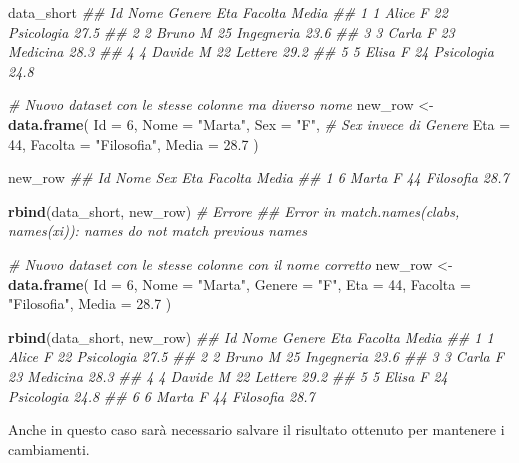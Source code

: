\documentclass[
]{book}
\newenvironment{Shaded}{\begin{snugshade}}{\end{snugshade}}
\newcommand{\CommentTok}[1]{\textcolor[rgb]{0.56,0.35,0.01}{\textit{#1}}}
\newcommand{\DataTypeTok}[1]{\textcolor[rgb]{0.13,0.29,0.53}{#1}}
\newcommand{\DecValTok}[1]{\textcolor[rgb]{0.00,0.00,0.81}{#1}}
\newcommand{\FloatTok}[1]{\textcolor[rgb]{0.00,0.00,0.81}{#1}}
\newcommand{\KeywordTok}[1]{\textcolor[rgb]{0.13,0.29,0.53}{\textbf{#1}}}
\newcommand{\NormalTok}[1]{#1}
\newcommand{\StringTok}[1]{\textcolor[rgb]{0.31,0.60,0.02}{#1}}
\begin{document}
\begin{Shaded}
\begin{Highlighting}[]
\NormalTok{data_short}
\CommentTok{##   Id   Nome Genere Eta    Facolta Media}
\CommentTok{## 1  1  Alice      F  22 Psicologia  27.5}
\CommentTok{## 2  2  Bruno      M  25 Ingegneria  23.6}
\CommentTok{## 3  3  Carla      F  23   Medicina  28.3}
\CommentTok{## 4  4 Davide      M  22    Lettere  29.2}
\CommentTok{## 5  5  Elisa      F  24 Psicologia  24.8}

\CommentTok{# Nuovo dataset con le stesse colonne ma diverso nome}
\NormalTok{new_row <-}\StringTok{ }\KeywordTok{data.frame}\NormalTok{(}
  \DataTypeTok{Id =} \DecValTok{6}\NormalTok{,}
  \DataTypeTok{Nome =} \StringTok{"Marta"}\NormalTok{,}
  \DataTypeTok{Sex =} \StringTok{"F"}\NormalTok{,      }\CommentTok{# Sex invece di Genere}
  \DataTypeTok{Eta =} \DecValTok{44}\NormalTok{,}
  \DataTypeTok{Facolta =} \StringTok{"Filosofia"}\NormalTok{,}
  \DataTypeTok{Media =} \FloatTok{28.7}
\NormalTok{)}

\NormalTok{new_row}
\CommentTok{##   Id  Nome Sex Eta   Facolta Media}
\CommentTok{## 1  6 Marta   F  44 Filosofia  28.7}

\KeywordTok{rbind}\NormalTok{(data_short, new_row) }\CommentTok{# Errore}
\CommentTok{## Error in match.names(clabs, names(xi)): names do not match previous names}

\CommentTok{# Nuovo dataset con le stesse colonne con il nome corretto}
\NormalTok{new_row <-}\StringTok{ }\KeywordTok{data.frame}\NormalTok{(}
  \DataTypeTok{Id =} \DecValTok{6}\NormalTok{,}
  \DataTypeTok{Nome =} \StringTok{"Marta"}\NormalTok{,}
  \DataTypeTok{Genere =} \StringTok{"F"}\NormalTok{, }
  \DataTypeTok{Eta =} \DecValTok{44}\NormalTok{,}
  \DataTypeTok{Facolta =} \StringTok{"Filosofia"}\NormalTok{,}
  \DataTypeTok{Media =} \FloatTok{28.7}
\NormalTok{)}

\KeywordTok{rbind}\NormalTok{(data_short, new_row)}
\CommentTok{##   Id   Nome Genere Eta    Facolta Media}
\CommentTok{## 1  1  Alice      F  22 Psicologia  27.5}
\CommentTok{## 2  2  Bruno      M  25 Ingegneria  23.6}
\CommentTok{## 3  3  Carla      F  23   Medicina  28.3}
\CommentTok{## 4  4 Davide      M  22    Lettere  29.2}
\CommentTok{## 5  5  Elisa      F  24 Psicologia  24.8}
\CommentTok{## 6  6  Marta      F  44  Filosofia  28.7}
\end{Highlighting}
\end{Shaded}

Anche in questo caso sarà necessario salvare il risultato ottenuto per mantenere i cambiamenti.
\end{document}
